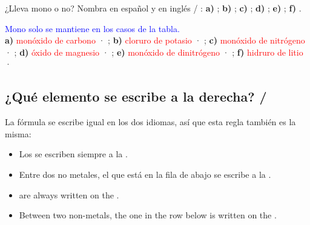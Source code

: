 \begin{exercise}
    ¿Lleva mono o no? Nombra en español y en inglés / : \textbf{a)} ; \textbf{b)} ; \textbf{c)} ; \textbf{d)} ; \textbf{e)} ; \textbf{f)} .
    \begin{solu}
        \textcolor{blue}{Mono solo se mantiene en los casos de la tabla.}\\
        \textbf{a)} \textcolor{red}{monóxido de carbono} · \textcolor{red}{}; \textbf{b)} \textcolor{red}{cloruro de potasio} · \textcolor{red}{}; \textbf{c)} \textcolor{red}{monóxido de nitrógeno} · \textcolor{red}{}; \textbf{d)} \textcolor{red}{óxido de magnesio} · \textcolor{red}{}; \textbf{e)} \textcolor{red}{monóxido de dinitrógeno} · \textcolor{red}{}; \textbf{f)} \textcolor{red}{hidruro de litio} · \textcolor{red}{}
    \end{solu}
\end{exercise}

\subsection{¿Qué elemento se escribe a la derecha? / }

La fórmula se escribe igual en los dos idiomas, así que esta regla también es la misma:

\begin{reglas}
    \begin{itemize}
        \item Los  se escriben siempre a la .
        \item Entre dos no metales, el que está  en la fila de abajo se escribe a la .
    \end{itemize}
    \ingles
    \begin{itemize}
        \item {} are always written on the .
        \item Between two non-metals, the one  in the row below is written on the .
    \end{itemize}
\end{reglas}


